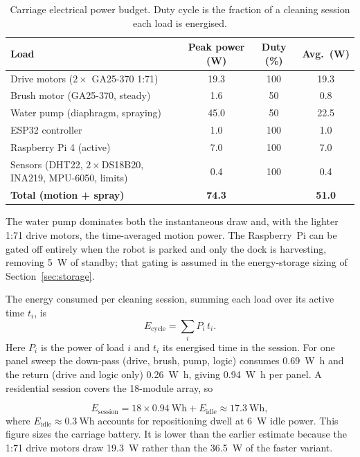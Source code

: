 \documentclass[11pt,a4paper]{article}
\begin{document}
\begin{table}[H]
\centering
\caption{Carriage electrical power budget. Duty cycle is the fraction of a
cleaning session each load is energised.}
\label{tab:carriage-budget}
\small
\begin{tabular}{l S[table-format=3.1] S[table-format=3.0] S[table-format=2.1]}
\toprule
Load & {Peak power (\si{\watt})} & {Duty (\si{\percent})} & {Avg.\ (\si{\watt})} \\
\midrule
Drive motors ($2\times$ GA25-370 1:71) & 19.3 & 100 & 19.3 \\
Brush motor (GA25-370, steady)    & 1.6  & 50  & 0.8 \\
Water pump (diaphragm, spraying)  & 45.0 & 50  & 22.5 \\
ESP32 controller                  & 1.0  & 100 & 1.0 \\
Raspberry Pi 4 (active)           & 7.0  & 100 & 7.0 \\
Sensors (DHT22, $2\times$DS18B20, INA219, MPU-6050, limits) & 0.4 & 100 & 0.4 \\
\midrule
\textbf{Total (motion + spray)}   & \textbf{74.3} & {} & \textbf{51.0} \\
\bottomrule
\end{tabular}
\end{table}

The water pump dominates both the instantaneous draw and, with the lighter
\num{1}:\num{71} drive motors, the time-averaged motion power. The Raspberry~Pi
can be gated off
entirely when the robot is parked and only the dock is harvesting, removing
\SI{5}{\watt} of standby; that gating is assumed in the energy-storage sizing of
Section~\ref{sec:storage}.

The energy consumed per cleaning session, summing each load over its active time
$t_i$, is
\begin{equation}
  E_{\text{cycle}} = \sum_i P_i\, t_i .
  \label{eq:ecycle}
\end{equation}
Here $P_i$ is the power of load $i$ and $t_i$ its energised time in the session.
For one panel sweep the down-pass (drive, brush, pump, logic) consumes
\SI{0.69}{\watt\hour} and the return (drive and logic only)
\SI{0.26}{\watt\hour}, giving \SI{0.94}{\watt\hour} per panel. A residential
session covers the \num{18}-module array, so

\begin{equation}
  E_{\text{session}} = 18 \times \SI{0.94}{\watt\hour} + E_{\text{idle}}
  \approx \SI{17.3}{\watt\hour},
  \label{eq:esession}
\end{equation}
where $E_{\text{idle}}\approx\SI{0.3}{\watt\hour}$ accounts for repositioning
dwell at \SI{6}{\watt} idle power. This figure sizes the carriage battery. It is
lower than the earlier estimate because the \num{1}:\num{71} drive motors draw
\SI{19.3}{\watt} rather than the \SI{36.5}{\watt} of the faster variant.
\end{document}
